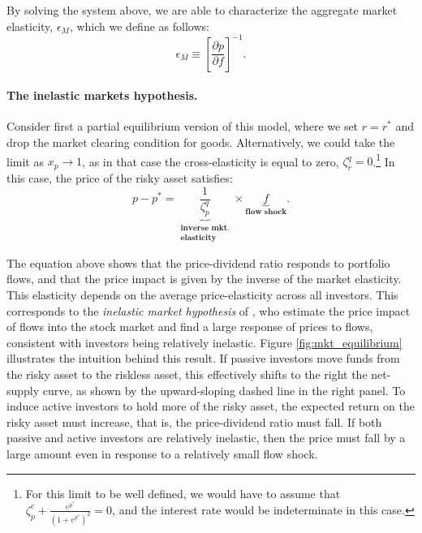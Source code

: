 By solving the system above, we are able to characterize the aggregate market elasticity, $\epsilon_M$, which we define as follows:
\begin{equation}
    \epsilon_M \equiv \left[\frac{\partial p}{\partial f}\right]^{-1}.
\end{equation}

\paragraph{The inelastic markets hypothesis.} Consider first a partial equilibrium version of this model, where we set $r = r^*$ and drop the market clearing condition for goods. Alternatively, we could take the limit as $x_p \rightarrow 1$, as in that case the cross-elasticity is equal to zero, $\zeta_r^q = 0$.\footnote{For this limit to be well defined, we would have to assume that $\zeta_p^c +\frac{e^{p^*}}{(1+e^{p^*})^2} = 0$, and the interest rate would be indeterminate in this case.} In this case, the price of the risky asset satisfies:
\begin{equation}
    p - p^* = \underbrace{\frac{1}{\zeta_p^q}}_{\substack{\textbf{inverse mkt.}\\ \textbf{elasticity}}} \times \underbrace{f}_{\textbf{flow shock}}.
\end{equation}

The equation above shows that the price-dividend ratio responds to portfolio flows, and that the price impact is given by the inverse of the market elasticity. 
This elasticity depends on the average price-elasticity across all investors. 
This corresponds to the \textit{inelastic market hypothesis} of \citet{gabaix2020search}, who estimate the price impact of flows into the stock market and find a large response of prices to flows, consistent with investors being relatively inelastic.  
Figure \ref{fig:mkt_equilibrium} illustrates the intuition behind this result. 
If passive investors move funds from the risky asset to the riskless asset, this effectively shifts to the right the net-supply curve, as shown by the upward-sloping dashed line in the right panel. 
To induce active investors to hold more of the risky asset, the expected return on the risky asset must increase, that is, the price-dividend ratio must fall. 
If both passive and active investors are relatively inelastic, then the price must fall by a large amount even in response to a relatively small flow shock.



